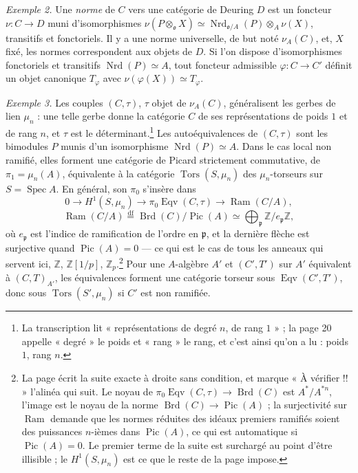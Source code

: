 \documentclass[11pt,a4paper]{article}
\begin{document}
\emph{Exemple 2.} Une \emph{norme} de $C$ vers une catégorie de Deuring $D$ est
un foncteur $\nu \colon C \to D$ muni d'isomorphismes
$\nu(P \otimes_{\mathfrak{o}} X) \simeq \operatorname{Nrd}_{\mathfrak{o}/A}(P)
\otimes_{A} \nu(X)$, transitifs et fonctoriels. Il y a une norme universelle,
de but noté $\nu_{A}(C)$, et, $X$ fixé, les normes correspondent aux objets de
$D$. Si l'on dispose d'isomorphismes fonctoriels et transitifs
$\operatorname{Nrd}(P) \simeq A$, tout foncteur admissible $\varphi \colon C \to
C'$ définit un objet canonique $T_{\varphi}$ avec $\nu(\varphi(X)) \simeq
T_{\varphi}$.

\emph{Exemple 3.} Les couples $(C, \tau)$, $\tau$ objet de $\nu_{A}(C)$,
généralisent les gerbes de lien $\mu_{n}$ : une telle gerbe donne la catégorie
$C$ de ses représentations de poids $1$ et de rang $n$, et $\tau$ est le
déterminant.\footnote{La transcription lit « représentations de degré $n$, de
rang $1$ » ; la page 20 appelle « degré » le poids et « rang » le rang, et
c'est ainsi qu'on a lu : poids $1$, rang $n$.} Les autoéquivalences de
$(C, \tau)$ sont les bimodules $P$ munis d'un isomorphisme
$\operatorname{Nrd}(P) \simeq A$. Dans le cas local non ramifié, elles forment
une catégorie de Picard strictement commutative, de $\pi_{1} = \mu_{n}(A)$,
équivalente à la catégorie $\operatorname{Tors}(S, \mu_{n})$ des
$\mu_{n}$-torseurs sur $S = \operatorname{Spec} A$. En général, son $\pi_{0}$
s'insère dans
\[
  0 \longrightarrow H^{1}(S, \mu_{n}) \longrightarrow
  \pi_{0}\operatorname{Eqv}(C, \tau) \longrightarrow \operatorname{Ram}(C/A) ,
\]
\[
  \operatorname{Ram}(C/A) \overset{\mathrm{df}}{=}
  \operatorname{Brd}(C)/\operatorname{Pic}(A) \simeq
  \bigoplus_{\mathfrak{p}} \mathbb{Z}/e_{\mathfrak{p}}\mathbb{Z} ,
\]
où $e_{\mathfrak{p}}$ est l'indice de ramification de l'ordre en $\mathfrak{p}$,
et la dernière flèche est surjective quand $\operatorname{Pic}(A) = 0$ --- ce qui
est le cas de tous les anneaux qui servent ici, $\mathbb{Z}$,
$\mathbb{Z}[1/p]$, $\mathbb{Z}_{p}$.\footnote{La page écrit la suite exacte à
droite sans condition, et marque « À vérifier !! » l'alinéa qui suit. Le noyau
de $\pi_{0}\operatorname{Eqv}(C, \tau) \to \operatorname{Brd}(C)$ est
$A^{*}/A^{*n}$, l'image est le noyau de la norme $\operatorname{Brd}(C) \to
\operatorname{Pic}(A)$ ; la surjectivité sur $\operatorname{Ram}$ demande que
les normes réduites des idéaux premiers ramifiés soient des puissances $n$-ièmes
dans $\operatorname{Pic}(A)$, ce qui est automatique si $\operatorname{Pic}(A) =
0$. Le premier terme de la suite est surchargé au point d'être illisible ; le
$H^{1}(S, \mu_{n})$ est ce que le reste de la page impose.} Pour une
$A$-algèbre $A'$ et $(C', T')$ sur $A'$ équivalent à $(C, T)_{A'}$, les
équivalences forment une catégorie torseur sous $\operatorname{Eqv}(C', T')$,
donc sous $\operatorname{Tors}(S', \mu_{n})$ si $C'$ est non ramifiée.
\end{document}
